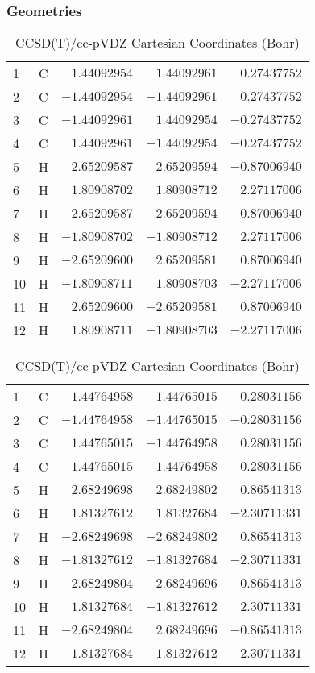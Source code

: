 \documentclass[10pt,oneside]{article}
\begin{document}
\begin{table}[h!]
\subsubsection*{Geometries}
\begin{multicols}{2}
\centering
\caption{CCSD(T)/cc-pVTZ Cartesian Coordinates (Bohr)}
\begin{tabular}{llrrr}
\toprule
1  & C  & $ 1.44092954$ & $ 1.44092961$ & $ 0.27437752$ \\
2  & C  & $-1.44092954$ & $-1.44092961$ & $ 0.27437752$ \\
3  & C  & $-1.44092961$ & $ 1.44092954$ & $-0.27437752$ \\
4  & C  & $ 1.44092961$ & $-1.44092954$ & $-0.27437752$ \\
5  & H  & $ 2.65209587$ & $ 2.65209594$ & $-0.87006940$ \\
6  & H  & $ 1.80908702$ & $ 1.80908712$ & $ 2.27117006$ \\
7  & H  & $-2.65209587$ & $-2.65209594$ & $-0.87006940$ \\
8  & H  & $-1.80908702$ & $-1.80908712$ & $ 2.27117006$ \\
9  & H  & $-2.65209600$ & $ 2.65209581$ & $ 0.87006940$ \\
10 & H  & $-1.80908711$ & $ 1.80908703$ & $-2.27117006$ \\
11 & H  & $ 2.65209600$ & $-2.65209581$ & $ 0.87006940$ \\
12 & H  & $ 1.80908711$ & $-1.80908703$ & $-2.27117006$ \\
\bottomrule
\end{tabular}
\caption{CCSD(T)/cc-pVDZ Cartesian Coordinates (Bohr)}
\begin{tabular}{llrrr}
\toprule
1  & C  & $ 1.44764958$ & $ 1.44765015$ & $-0.28031156$ \\
2  & C  & $-1.44764958$ & $-1.44765015$ & $-0.28031156$ \\
3  & C  & $ 1.44765015$ & $-1.44764958$ & $ 0.28031156$ \\
4  & C  & $-1.44765015$ & $ 1.44764958$ & $ 0.28031156$ \\
5  & H  & $ 2.68249698$ & $ 2.68249802$ & $ 0.86541313$ \\
6  & H  & $ 1.81327612$ & $ 1.81327684$ & $-2.30711331$ \\
7  & H  & $-2.68249698$ & $-2.68249802$ & $ 0.86541313$ \\
8  & H  & $-1.81327612$ & $-1.81327684$ & $-2.30711331$ \\
9  & H  & $ 2.68249804$ & $-2.68249696$ & $-0.86541313$ \\
10 & H  & $ 1.81327684$ & $-1.81327612$ & $ 2.30711331$ \\
11 & H  & $-2.68249804$ & $ 2.68249696$ & $-0.86541313$ \\
12 & H  & $-1.81327684$ & $ 1.81327612$ & $ 2.30711331$ \\
\bottomrule
\end{tabular}
\end{multicols}
\end{table}
\end{document}
